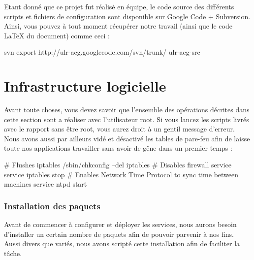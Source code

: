 \documentclass[11pt,a4paper]{report}
\begin{document}
            Etant donné que ce projet fut réalisé en équipe, le code source des différents scripts et fichiers de configuration sont disponible sur Google Code + Subversion. Ainsi, vous pouvez à tout moment récupérer notre travail (ainsi que le code {\LaTeX} du document) comme ceci :\\
            
            \begin{bashcode}
                    svn export http://ulr-acg.googlecode.com/svn/trunk/ ulr-acg-src
            \end{bashcode}
            
    
    \part{Infrastructure logicielle}
        
        Avant toute choses, vous devez savoir que l'ensemble des opérations décrites dans cette section sont a réaliser avec l'utilisateur root. Si vous lancez les scripts livrés avec le rapport sans être root, vous aurez droit à un gentil message d'erreur.\\
        
        Nous avons aussi par ailleurs vidé et désactivé les tables de pare-feu afin de laisse toute nos applications travailler sans avoir de gêne dans un premier temps :\\
        
        \begin{bashcode}
                    # Flushes iptables
                    /sbin/chkconfig --del iptables
                    # Disables firewall service
                    service iptables stop
                    # Enables Network Time Protocol to sync time between machines
                    service ntpd start
        \end{bashcode}
        
        \section{Installation des paquets}
            
            Avant de commencer à configurer et déployer les services, nous aurons besoin d'installer un certain nombre de paquets afin de pouvoir parvenir à nos fins. Aussi divers que variés, nous avons scripté cette installation afin de faciliter la tâche.\\
            
\end{document}
